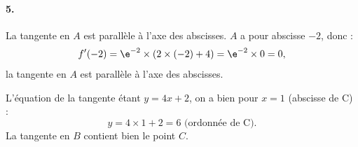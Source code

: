 \paragraph{5.}
La tangente en \(A\) est parallèle à l'axe des abscisses.  
\(A\) a pour abscisse \(-2\), donc :
\[
f'(-2) = \e^{-2} \times (2 \times (-2) + 4) = \e^{-2} \times 0 = 0,
\]
la tangente en \(A\) est parallèle à l'axe des abscisses.

L'équation de la tangente étant \(y = 4x + 2\), on a bien pour \(x = 1\) (abscisse de C) :
\[
y = 4 \times 1 + 2 = 6 \text{ (ordonnée de C).}
\]
La tangente en \(B\) contient bien le point \(C\).
